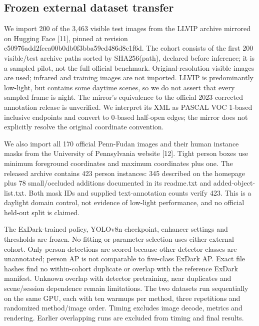 \documentclass[11pt,a4paper]{article}
\begin{document}
\subsection{Frozen external dataset transfer}

We import 200 of the 3,463 visible test images from the LLVIP archive mirrored on Hugging Face [11], pinned at revision e50976add2fcca00b0db0f3bba59ed486d8c1f6d. The cohort consists of the first 200 visible/test archive paths sorted by SHA256(path), declared before inference; it is a sampled pilot, not the full official benchmark. Original-resolution visible images are used; infrared and training images are not imported. LLVIP is predominantly low-light, but contains some daytime scenes, so we do not assert that every sampled frame is night. The mirror's equivalence to the official 2023 corrected annotation release is unverified. We interpret its XML as PASCAL VOC 1-based inclusive endpoints and convert to 0-based half-open edges; the mirror does not explicitly resolve the original coordinate convention.


We also import all 170 official Penn-Fudan images and their human instance masks from the University of Pennsylvania website [12]. Tight person boxes use minimum foreground coordinates and maximum coordinates plus one. The released archive contains 423 person instances: 345 described on the homepage plus 78 small/occluded additions documented in its readme.txt and added-object-list.txt. Both mask IDs and supplied text-annotation counts verify 423. This is a daylight domain control, not evidence of low-light performance, and no official held-out split is claimed.


The ExDark-trained policy, YOLOv8n checkpoint, enhancer settings and thresholds are frozen. No fitting or parameter selection uses either external cohort. Only person detections are scored because other detector classes are unannotated; person AP is not comparable to five-class ExDark AP. Exact file hashes find no within-cohort duplicate or overlap with the reference ExDark manifest. Unknown overlap with detector pretraining, near duplicates and scene/session dependence remain limitations. The two datasets run sequentially on the same GPU, each with ten warmups per method, three repetitions and randomized method/image order. Timing excludes image decode, metrics and rendering. Earlier overlapping runs are excluded from timing and final results.
\end{document}
